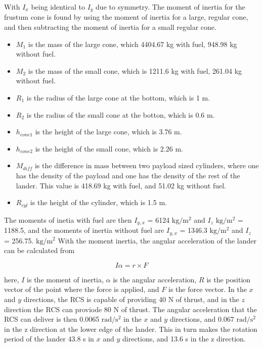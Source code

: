 With $I_x$ being identical to $I_y$ due to symmetry. The moment of inertia for the frustum cone is found by using the moment of inertia for a large, regular cone, and then subtracting the moment of inertia for a small regular cone. 

\begin{itemize}
\item $M_1$ is the mass of the large cone, which 4404.67 kg with fuel, 948.98 kg without fuel.
\item $M_2$ is the mass of the small cone, which is 1211.6 kg with fuel, 261.04 kg without fuel.
\item $R_1$ is the radius of the large cone at the bottom, which is 1 m.
\item $R_2$ is the radius of the small cone at the botton, which is 0.6 m.
\item $h_{cone1}$ is the height of the large cone, which is 3.76 m.
\item $h_{cone2}$ is the height of the small cone, which is 2.26 m.
\item $M_{diff}$ is the difference in mass between two payload sized cylinders, where one has the density of the payload and one has the density of the rest of the lander. This value is 418.69 kg with fuel, and 51.02 kg without fuel.
\item $R_{cyl}$ is the height of the cylinder, which is 1.5 m.
\end{itemize}

The moments of inetia with fuel are then $I_{y,x}$ = 6124 $\mathrm{kg/m^2}$ and $I_{z}$ $\mathrm{kg/m^2}$ = 1188.5, and the moments of inertia without fuel are $I_{y,x}$ = 1346.3 $\mathrm{kg/m^2}$ and $I_{z}$ = 256.75. $\mathrm{kg/m^2}$ With the moment inertia, the angular acceleration of the lander can be calculated from

\begin{equation}
    I \alpha = r \times F
\end{equation}
    
here, $I$ is the moment of inertia, $\alpha$ is the angular acceleration, $R$ is the position vector of the point where the force is applied, and $F$ is the force vector. In the $x$ and $y$ directions, the RCS is capable of providing 40 N of thrust, and in the $z$ direction the RCS can proviode 80 N of thrust. The angular acceleration that the RCS can deliver is then 0.0065 $\mathrm{rad/s^2}$ in the $x$ and $y$ directions, and 0.067 $\mathrm{rad/s^2}$ in the z direction at the lower edge of the lander. This in turn makes the rotation period of the lander 43.8 s in $x$ and $y$ directions, and 13.6 s in the z direction.\\

